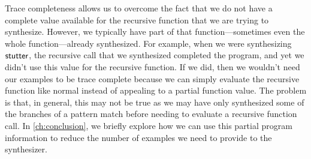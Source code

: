 Trace completeness allows us to overcome the fact that we do not have a complete value available for the recursive function that we are trying to synthesize.
However, we typically have part of that function---sometimes even the whole function---already synthesized.
For example, when we were synthesizing $\mathsf{stutter}$, the recursive call that we synthesized completed the program, and yet we didn't use this value for the recursive function.
If we did, then we wouldn't need our examples to be trace complete because we can simply evaluate the recursive function like normal instead of appealing to a partial function value.
The problem is that, in general, this may not be true as we may have only synthesized some of the branches of a pattern match before needing to evaluate a recursive function call.
In \autoref{ch:conclusion}, we briefly explore how we can use this partial program information to reduce the number of examples we need to provide to the synthesizer.
